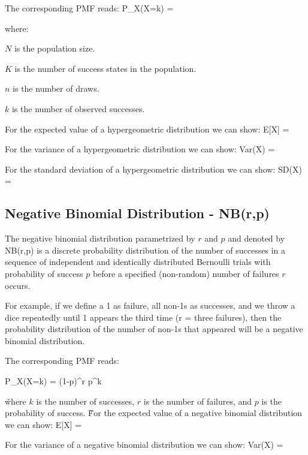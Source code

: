 The corresponding PMF reads:
\bse
P_{X}(X=k) = 
\ese
\ed

where:
\bit
\item $N$ is the population size.
\item $K$ is the number of success states in the population.
\item $n$ is the number of draws.
\item $k$ is the number of observed successes.
\eit

For the expected value of a hypergeometric distribution we can show:
\bse
E[X] = 
\ese

For the variance of a hypergeometric distribution we can show:
\bse
Var(X) =   
\ese

For the standard deviation of a hypergeometric distribution we can show:
\bse
SD(X) = 
\ese

\subsection{Negative Binomial Distribution - NB(r,p)}

The negative binomial distribution parametrized by $r$ and $p$ and denoted by NB(r,p) is a discrete probability
distribution of the number of successes in a sequence of independent and identically distributed Bernoulli trials
with probability of success $p$ before a specified (non-random) number of failures $r$ occurs.

\be
For example, if we define a 1 as failure, all non-1s as successes, and we throw a dice repeatedly until 1 appears the
third time (r = three failures), then the probability distribution of the number of non-1s that appeared will be a
negative binomial distribution.
\ee

The corresponding PMF reads:

\bse
P_{X}(X=k) =  (1-p)^r p^{k}
\ese
\ed

\v

where $k$ is the number of successes, $r$ is the number of failures, and $p$ is the probability of success. \v

For the expected value of a negative binomial distribution we can show:
\bse
E[X] = 
\ese

For the variance of a negative binomial distribution we can show:
\bse
Var(X) = 
\ese

